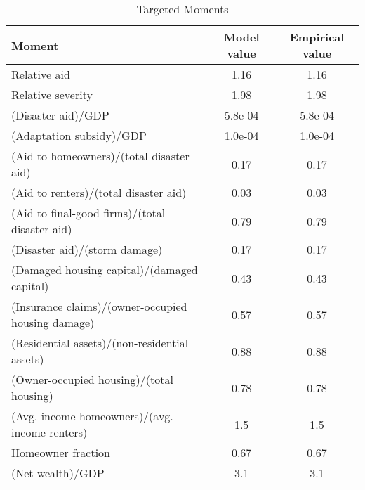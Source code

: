 \begin{table}[H] 
\singlespace 
\center 
\caption{Targeted Moments} \label{tab:targets}
\vspace{-.1in} 
\begin{tabular}{l c c}\hline 
\hline 
 Moment & Model value & Empirical value  \\ 
 \hline 
Relative aid  &      1.16  &      1.16 \\ Relative severity  &      1.98  &     1.98  \\ (Disaster aid)/GDP &   5.8e-04  &   5.8e-04 \\ (Adaptation subsidy)/GDP &   1.0e-04  &   1.0e-04  \\ (Aid to homeowners)/(total disaster aid) &      0.17  &       0.17 \\ (Aid to renters)/(total disaster aid) &      0.03  &      0.03 \\ (Aid to final-good firms)/(total disaster aid) &      0.79  &      0.79 \\ (Disaster aid)/(storm damage) &      0.17  &      0.17 \\ (Damaged housing capital)/(damaged capital) &      0.43  &      0.43 \\ (Insurance claims)/(owner-occupied housing damage) &      0.57  &     0.57 \\ (Residential assets)/(non-residential assets) &      0.88  &      0.88 \\ (Owner-occupied housing)/(total housing) &      0.78  &      0.78 \\ (Avg. income homeowners)/(avg. income renters) &       1.5  &       1.5  \\ Homeowner fraction &      0.67  &     0.67 \\ (Net wealth)/GDP  &       3.1  &       3.1  \\ \hline 
\end{tabular}
\end{table} 
